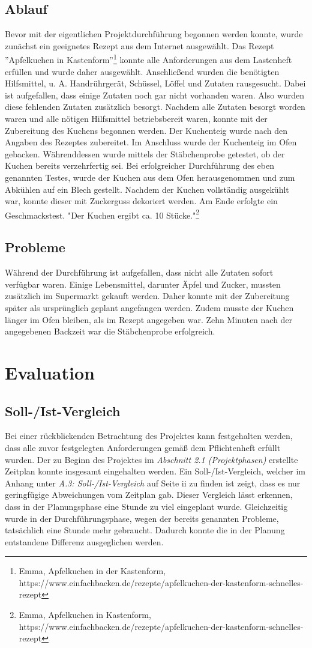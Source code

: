 \subsection{Ablauf}
Bevor mit der eigentlichen Projektdurchführung begonnen werden konnte, wurde zunächst ein geeignetes Rezept aus dem Internet ausgewählt. Das Rezept ''Apfelkuchen in Kastenform''\footnote{Emma, Apfelkuchen in der Kastenform, https://www.einfachbacken.de/rezepte/apfelkuchen-der-kastenform-schnelles-rezept} konnte alle Anforderungen aus dem Lastenheft erfüllen und wurde daher ausgewählt.
Anschließend wurden die benötigten Hilfsmittel, u. A. Handrührgerät, Schüssel, Löffel und Zutaten rausgesucht. Dabei ist aufgefallen, dass einige Zutaten
noch gar nicht vorhanden waren. Also wurden diese fehlenden Zutaten zusätzlich besorgt. Nachdem alle Zutaten besorgt worden waren und alle nötigen Hilfsmittel betriebsbereit waren, konnte mit der
Zubereitung des Kuchens begonnen werden. Der Kuchenteig wurde nach den Angaben des Rezeptes zubereitet. Im Anschluss wurde der Kuchenteig im Ofen gebacken.
Währenddessen wurde mittels der Stäbchenprobe getestet, ob der Kuchen bereits verzehrfertig sei. Bei erfolgreicher Durchführung des eben genannten Testes, wurde der Kuchen aus dem Ofen herausgenommen und zum Abkühlen auf ein Blech gestellt.
Nachdem der Kuchen vollständig ausgekühlt war, konnte dieser mit Zuckerguss dekoriert werden. Am Ende erfolgte ein Geschmackstest. "Der Kuchen ergibt ca. 10 Stücke."\footnote{Emma, Apfelkuchen in Kastenform, https://www.einfachbacken.de/rezepte/apfelkuchen-der-kastenform-schnelles-rezept}
\subsection{Probleme}
Während der Durchführung ist aufgefallen, dass nicht alle Zutaten sofort verfügbar waren. Einige Lebensmittel, darunter Äpfel und Zucker, mussten zusätzlich im Supermarkt gekauft werden. Daher konnte mit der Zubereitung später als ursprünglich geplant angefangen werden.
Zudem musste der Kuchen länger im Ofen bleiben, als im Rezept angegeben war. Zehn Minuten nach der angegebenen Backzeit war die Stäbchenprobe erfolgreich.
\section{Evaluation}
\subsection{Soll-/Ist-Vergleich}
Bei einer rückblickenden Betrachtung des Projektes kann festgehalten werden, dass alle zuvor festgelegten Anforderungen gemäß dem Pflichtenheft erfüllt wurden. Der zu Beginn des Projektes im \emph{Abschnitt 2.1 (Projektphasen)} erstellte Zeitplan konnte insgesamt eingehalten werden.
Ein Soll-/Ist-Vergleich, welcher im Anhang unter \emph{A.3: Soll-/Ist-Vergleich} auf Seite ii zu finden ist zeigt, dass es nur geringfügige Abweichungen vom Zeitplan gab. Dieser Vergleich lässt erkennen, dass in der Planungsphase eine Stunde zu viel eingeplant wurde. Gleichzeitig wurde in der Durchführungsphase, wegen der bereits genannten Probleme, tatsächlich eine Stunde mehr gebraucht.
Dadurch konnte die in der Planung entstandene Differenz ausgeglichen werden.
